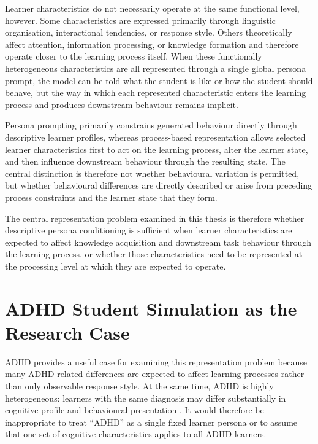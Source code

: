 Learner characteristics do not necessarily operate at the same functional level, however. Some characteristics are expressed primarily through linguistic organisation, interactional tendencies, or response style. Others theoretically affect attention, information processing, or knowledge formation and therefore operate closer to the learning process itself. When these functionally heterogeneous characteristics are all represented through a single global persona prompt, the model can be told what the student is like or how the student should behave, but the way in which each represented characteristic enters the learning process and produces downstream behaviour remains implicit.

Persona prompting primarily constrains generated behaviour directly through descriptive learner profiles, whereas process-based representation allows selected learner characteristics first to act on the learning process, alter the learner state, and then influence downstream behaviour through the resulting state. The central distinction is therefore not whether behavioural variation is permitted, but whether behavioural differences are directly described or arise from preceding process constraints and the learner state that they form.

The central representation problem examined in this thesis is therefore whether descriptive persona conditioning is sufficient when learner characteristics are expected to affect knowledge acquisition and downstream task behaviour through the learning process, or whether those characteristics need to be represented at the processing level at which they are expected to operate.

\section{ADHD Student Simulation as the Research Case}

ADHD provides a useful case for examining this representation problem because many ADHD-related differences are expected to affect learning processes rather than only observable response style. At the same time, ADHD is highly heterogeneous: learners with the same diagnosis may differ substantially in cognitive profile and behavioural presentation \cite{willcutt-etal-2005-validity,luo-etal-2019-heterogeneity}. It would therefore be inappropriate to treat ``ADHD'' as a single fixed learner persona or to assume that one set of cognitive characteristics applies to all ADHD learners.

